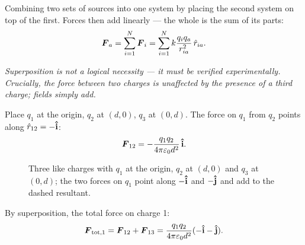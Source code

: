 \begin{theorem}
Combining two sets of sources into one system by placing the second system on top of the first. Forces then add linearly --- the whole is the sum of its parts:
\[
    \vect{F}_a = \sum_{i=1}^{N} \vect{F}_i = \sum_{i=1}^{N} k\frac{q_i q_a}{r_{ia}^2}\,\hat{r}_{ia}.
\]
\end{theorem}

\textit{Superposition is not a logical necessity — it must be verified experimentally. Crucially, the force between two charges is unaffected by the presence of a third charge; fields simply add.}

\begin{example}
Place $q_1$ at the origin, $q_2$ at $(d,0)$, $q_3$ at $(0,d)$. The force on $q_1$ from $q_2$ points along $\hat{r}_{12} = -\boldsymbol{\hat{\textbf{i}}}$:
\[
    \vect{F}_{12} = -\frac{q_1 q_2}{4\pi\varepsilon_0 d^2}\,\ihat.
\]

\begin{figure}[H]
\begin{center}
\end{center}
\caption{Three like charges with $q_1$ at the origin, $q_2$ at $(d,0)$ and $q_3$ at $(0,d)$; the two forces on $q_1$ point along $-\boldsymbol{\hat{\textbf{i}}}$ and $-\boldsymbol{\hat{\textbf{j}}}$ and add to the dashed resultant.}
\end{figure}

By superposition, the total force on charge 1:
\[
    \vect{F}_{\text{tot},1} = \vect{F}_{12} + \vect{F}_{13}
    = \frac{q_1 q_2}{4\pi\varepsilon_0 d^2}(-\ihat - \jhat).
\]
\end{example}

